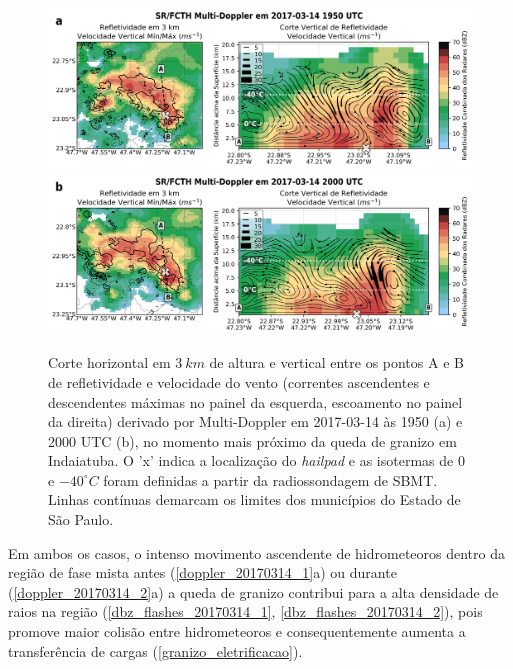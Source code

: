 \begin{figure}[hbt]
	\centering
	\caption{Corte horizontal em $3\:km$ de altura e vertical entre os pontos A e B de refletividade e velocidade do vento (correntes ascendentes e descendentes máximas no painel da esquerda, escoamento no painel da direita) derivado por Multi-Doppler em 2017-03-14 às 1950 (a) e 2000 UTC (b), no momento mais próximo da queda de granizo em Indaiatuba. O 'x' indica a localização do \textit{hailpad} e as isotermas de $0$ e $-40^{\circ}C$ foram definidas a partir da radiossondagem de SBMT. Linhas contínuas demarcam os limites dos municípios do Estado de São Paulo.} 
	\label{doppler_20170314_2}
	\vspace{-5pt}
	\includegraphics[width=\columnwidth]{../MultiDoppler_Processing/figures/SR-FCTH 2017-03-14 1950 UTC_ptbr.png} \\
	\vspace{-5pt}
	\includegraphics[width=\columnwidth]{../MultiDoppler_Processing/figures/SR-FCTH 2017-03-14 2000 UTC_ptbr.png} \\
\end{figure}

Em ambos os casos, o intenso movimento ascendente de hidrometeoros dentro da região de fase mista antes (\autoref{doppler_20170314_1}a) ou durante (\autoref{doppler_20170314_2}a) a queda de granizo contribui para a alta densidade de raios na região (\autoref{dbz_flashes_20170314_1}, \autoref{dbz_flashes_20170314_2}), pois promove maior colisão entre hidrometeoros e consequentemente aumenta a transferência de cargas (\autoref{granizo_eletrificacao}).

